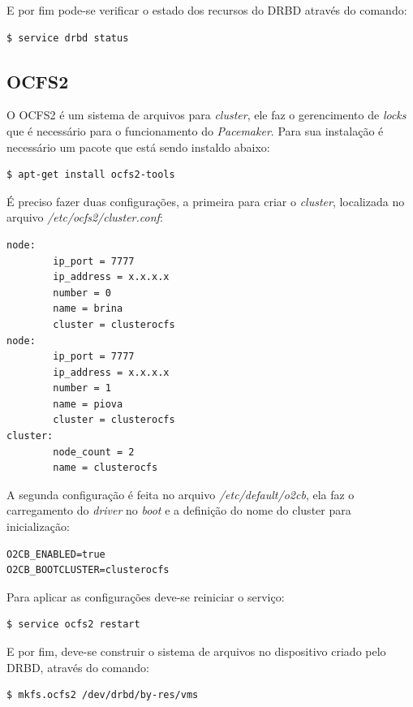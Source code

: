 E por fim pode-se verificar o estado dos recursos do \ac{DRBD} através do comando:
\begin{lstlisting}[language=bash]
 $ service drbd status
\end{lstlisting}

\subsection{OCFS2}

O \ac{OCFS2} é um sistema de arquivos para \textit{cluster}, ele faz o gerencimento de \textit{locks} que é necessário para o funcionamento 
do \textit{Pacemaker}. Para sua instalação é necessário um pacote que está sendo instaldo abaixo:
\begin{lstlisting}[language=bash]
 $ apt-get install ocfs2-tools
\end{lstlisting}

É preciso fazer duas configurações, a primeira para criar o \textit{cluster}, localizada no arquivo \textit{/etc/ocfs2/cluster.conf}:
\begin{lstlisting}
node:
        ip_port = 7777
        ip_address = x.x.x.x
        number = 0
        name = brina
        cluster = clusterocfs
node:
        ip_port = 7777
        ip_address = x.x.x.x
        number = 1
        name = piova
        cluster = clusterocfs
cluster:
        node_count = 2
        name = clusterocfs
\end{lstlisting}

A segunda configuração é feita no arquivo \textit{/etc/default/o2cb}, ela faz o carregamento do \textit{driver} no \textit{boot} e a definição 
do nome do cluster para inicialização:
\begin{lstlisting}
O2CB_ENABLED=true
O2CB_BOOTCLUSTER=clusterocfs
\end{lstlisting}

Para aplicar as configurações deve-se reiniciar o serviço:
\begin{lstlisting}[language=bash]
 $ service ocfs2 restart
\end{lstlisting}

E por fim, deve-se construir o sistema de arquivos no dispositivo criado pelo \ac{DRBD}, através do comando:
\begin{lstlisting}[language=bash]
 $ mkfs.ocfs2 /dev/drbd/by-res/vms
\end{lstlisting}

